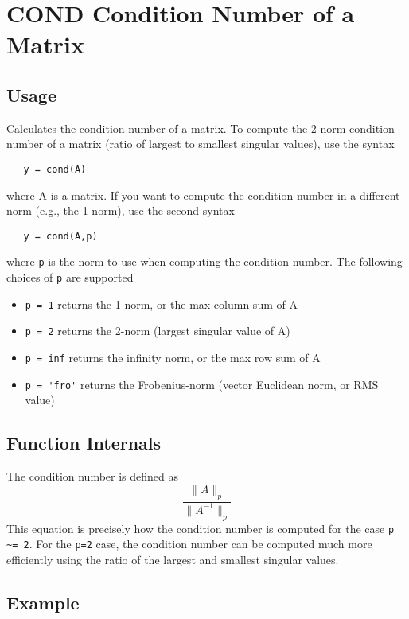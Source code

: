 \section{COND Condition Number of a Matrix}

\subsection{Usage}

Calculates the condition number of a matrix.  To compute the
2-norm condition number of a matrix (ratio of largest to smallest
singular values), use the syntax
\begin{verbatim}
   y = cond(A)
\end{verbatim}
where A is a matrix.  If you want to compute the condition number
in a different norm (e.g., the 1-norm), use the second syntax
\begin{verbatim}
   y = cond(A,p)
\end{verbatim}
where \verb|p| is the norm to use when computing the condition number.
The following choices of \verb|p| are supported
\begin{itemize}
\item  \verb|p = 1| returns the 1-norm, or the max column sum of A

\item  \verb|p = 2| returns the 2-norm (largest singular value of A)

\item  \verb|p = inf| returns the infinity norm, or the max row sum of A

\item  \verb|p = 'fro'| returns the Frobenius-norm (vector Euclidean norm, or RMS value)

\end{itemize}
\subsection{Function Internals}

The condition number is defined as
\[
  \frac{\|A\|_p}{\|A^{-1}\|_p}
\]
This equation is precisely how the condition number is computed for
the case \verb|p ~= 2|.  For the \verb|p=2| case, the condition number can 
be computed much more efficiently using the ratio of the largest and
smallest singular values.
\subsection{Example}

